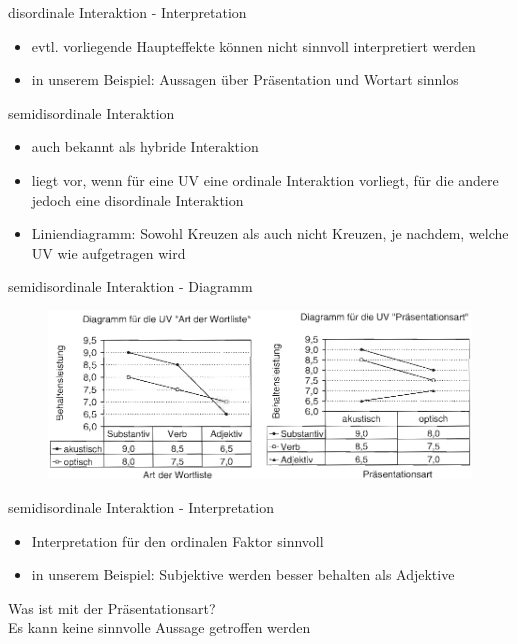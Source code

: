 \documentclass{beamer}
\begin{document}
	\begin{frame}{disordinale Interaktion - Interpretation}
		\begin{itemize}
			\item evtl. vorliegende Haupteffekte können nicht sinnvoll interpretiert werden
			\item in unserem Beispiel: Aussagen über Präsentation und Wortart sinnlos
		\end{itemize}
	\end{frame}
	
	\begin{frame}{semidisordinale Interaktion}
		\begin{itemize}
			\item auch bekannt als hybride Interaktion
			\item liegt vor, wenn für eine UV eine ordinale Interaktion vorliegt, für die andere jedoch eine disordinale Interaktion
			\item Liniendiagramm: Sowohl Kreuzen als auch nicht Kreuzen, je nachdem, welche UV wie aufgetragen wird
		\end{itemize}
	\end{frame}
	
	\begin{frame}{semidisordinale Interaktion - Diagramm}
		\begin{figure}
			\centering
			\includegraphics[width=1.0\textwidth]{Bilder/semidisordinaleI.png}
		\end{figure}
	\end{frame}
	
	\begin{frame}{semidisordinale Interaktion - Interpretation}
		\begin{itemize}
			\item Interpretation für den ordinalen Faktor sinnvoll
			\item in unserem Beispiel: Subjektive werden besser behalten als Adjektive
		\end{itemize}
		\alert{Was ist mit der Präsentationsart?}
		\pause \\
		Es kann keine sinnvolle Aussage getroffen werden
	\end{frame}
	
\end{document}
